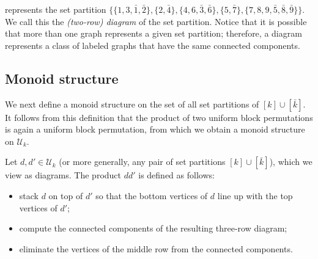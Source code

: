 \documentclass[ALCO,Unicode]{cedram}
\newcommand{\defncolor}{\color{darkred}}
\newcommand{\defn}[1]{{\defncolor\emph{#1}}} %
\begin{document}
represents the set partition $\{ \{1,3,\bar{1},\bar{2} \}, \{2,\bar{4} \}, \{4,6,\bar{3}, \bar{6}\}, \{5,\bar{7} \}, \{7, 8, 9, \bar{5}, \bar{8}, \bar{9} \}  \}$.
We call this the \defn{(two-row) diagram} of the set partition.
Notice that it is possible that more than one graph represents a given set
partition; therefore, a diagram represents a class of labeled graphs that have
the same connected components.

\subsection{Monoid structure}
\label{sec:monoidstructure}
We next define a monoid structure on the set of all set partitions of $[k] \cup
[\bar{k}]$. It follows from this definition that the product of two uniform
block permutations is again a uniform block permutation, from which we obtain
a monoid structure on $\mathcal{U}_k$.

Let $d, d' \in \mathcal{U}_k$ (or more generally, any pair of set partitions
$[k] \cup [\bar{k}]$), which we view as diagrams. The product $d d'$ is defined
as follows:
\begin{itemize}
    \item
        stack $d$ on top of $d'$ so that the bottom vertices of $d$
        line up with the top vertices of $d'$;

    \item
        compute the connected components of the resulting three-row diagram;

    \item
        eliminate the vertices of the middle row from the connected components.
\end{itemize}
\end{document}
